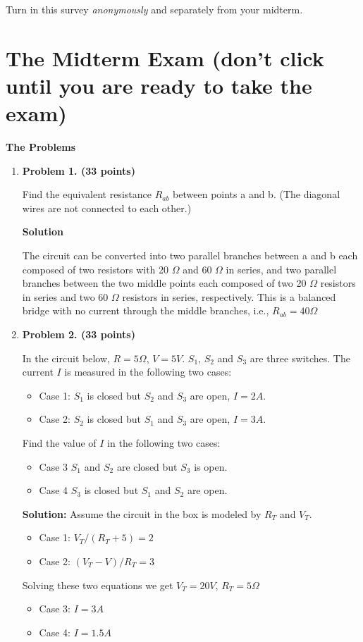 Turn in this survey {\em anonymously} and separately from your midterm.


\section*{The Midterm Exam (don't click until you are ready to take the exam)}

{\bf The Problems}
\begin{enumerate}


\item {\bf Problem 1. (33 points)} 

  Find the equivalent resistance $R_{ab}$ between points a and b. (The diagonal
  wires are not connected to each other.)


  {\bf Solution}

  The circuit can be converted into two parallel branches between a and b
  each composed of two resistors with 20 $\Omega$ and 60 $\Omega$ in series,
  and two parallel branches between the two middle points each composed of 
  two 20 $\Omega$ resistors in series and two 60 $\Omega$ resistors in
  series, respectively. This is a balanced bridge with no current through
  the middle branches, i.e., $R_{ab}=40\Omega$

\item {\bf Problem 2. (33 points)} 

  In the circuit below, $R=5\Omega$, $V=5V$. $S_1$, $S_2$ and $S_3$
  are three switches. The current $I$ is measured in the following
  two cases:
  \begin{itemize}
  \item Case 1: $S_1$ is closed but $S_2$ and $S_3$ are open, $I=2A$.
  \item Case 2: $S_2$ is closed but $S_1$ and $S_3$ are open, $I=3A$.
  \end{itemize}
  Find the value of $I$ in the following two cases:
  \begin{itemize}
  \item Case 3 $S_1$ and $S_2$ are closed but $S_3$ is open.
  \item Case 4 $S_3$ is closed but $S_1$ and $S_2$ are open.
  \end{itemize}


  {\bf Solution:} Assume the circuit in the box is modeled by
  $R_T$ and $V_T$. 
  \begin{itemize}
  \item Case 1: $V_T/(R_T+5)=2$
  \item Case 2: $(V_T-V)/R_T=3$
  \end{itemize}
  Solving these two equations we get $V_T=20V$, $R_T=5\Omega$
  \begin{itemize}
  \item Case 3: $I=3A$
  \item Case 4: $I=1.5A$
  \end{itemize}



\end{enumerate}
